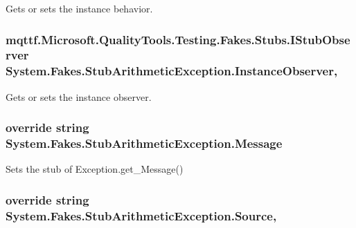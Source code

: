 Gets or sets the instance behavior.

\hypertarget{class_system_1_1_fakes_1_1_stub_arithmetic_exception_a153f776cf90d50a3295ab56276a29e07}{
\subsubsection[{Instance\-Observer}]{\setlength{\rightskip}{0pt plus 5cm}mqttf.\-Microsoft.\-Quality\-Tools.\-Testing.\-Fakes.\-Stubs.\-I\-Stub\-Observer System.\-Fakes.\-Stub\-Arithmetic\-Exception.\-Instance\-Observer\hspace{0.3cm}{\ttfamily [get]}, {\ttfamily [set]}}}\label{class_system_1_1_fakes_1_1_stub_arithmetic_exception_a153f776cf90d50a3295ab56276a29e07}


Gets or sets the instance observer.

\hypertarget{class_system_1_1_fakes_1_1_stub_arithmetic_exception_ac201729fbf194a909444dabc6f8deae7}{
\subsubsection[{Message}]{\setlength{\rightskip}{0pt plus 5cm}override string System.\-Fakes.\-Stub\-Arithmetic\-Exception.\-Message\hspace{0.3cm}{\ttfamily [get]}}}\label{class_system_1_1_fakes_1_1_stub_arithmetic_exception_ac201729fbf194a909444dabc6f8deae7}


Sets the stub of Exception.\-get\-\_\-\-Message()

\hypertarget{class_system_1_1_fakes_1_1_stub_arithmetic_exception_a659ee2153022c428d4b05332cfeba641}{
\subsubsection[{Source}]{\setlength{\rightskip}{0pt plus 5cm}override string System.\-Fakes.\-Stub\-Arithmetic\-Exception.\-Source\hspace{0.3cm}{\ttfamily [get]}, {\ttfamily [set]}}}\label{class_system_1_1_fakes_1_1_stub_arithmetic_exception_a659ee2153022c428d4b05332cfeba641}


